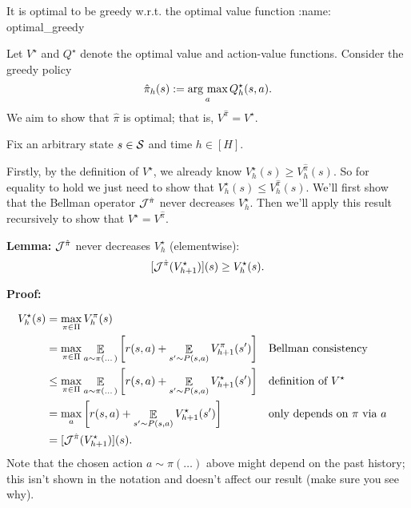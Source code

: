 \documentclass[\main/main]{subfiles}
\begin{document}
\begin{theorem}{It is optimal to be greedy w.r.t. the optimal value function}
:name: optimal_greedy

    Let $V^{\star}$ and $Q^{\star}$ denote the optimal value and action-value functions. Consider the greedy policy
    \[
        \hat \pi_h(s) := \argmax_a Q_h^{\star}(s, a).
    \]
    We aim to show that $\hat \pi$ is optimal; that is, $V^{\hat \pi} = V^{\star}$.

    Fix an arbitrary state $s \in \S$ and time $h \in [H]$.

    Firstly, by the definition of $V^{\star}$, we already know $V_h^{\star}(s) \ge V_h^{\hat \pi}(s)$. So for equality to hold we just need to show that $V_h^{\star}(s) \le V_h^{\hat \pi}(s)$. We'll first show that the Bellman operator $\bop^{\hat \pi}$ never decreases $V_h^{\star}$. Then we'll apply this result recursively to show that $V^{\star} = V^{\hat \pi}$.
    
    \textbf{Lemma:} $\bop^{\hat \pi}$ never decreases $V_h^{\star}$ (elementwise):
    \[
        [\bop^{\hat \pi} (V_{h+1}^{\star})](s) \ge V_h^{\star}(s).
    \]
    
    \textbf{Proof:}
    
    \begin{align*}
    V_h^{\star}(s) &= \max_{\pi \in \Pi} V_h^{\pi}(s) \\
    &= \max_{\pi \in \Pi} \mathop{\mathbb{E}}_{a \sim \pi(\dots)}\left[r(s, a) + \mathop{\mathbb{E}}_{s' \sim P(s, a)} V_{h+1}^\pi(s') \right] && \text{Bellman consistency} \\
    &\le \max_{\pi \in \Pi} \mathop{\mathbb{E}}_{a \sim \pi(\dots)}\left[r(s, a) + \mathop{\mathbb{E}}_{s' \sim P(s, a)} V_{h+1}^{\star}(s') \right] && \text{definition of } V^\star \\
    &= \max_{a} \left[ r(s, a) + \mathop{\mathbb{E}}_{s' \sim P(s, a)} V_{h+1}^{\star}(s') \right] && \text{only depends on } \pi \text{ via } a \\
    &= [\bop^{\hat \pi}(V_{h+1}^{\star})](s).
    \end{align*}
    Note that the chosen action $a \sim \pi(\dots)$ above might depend on the past history; this isn't shown in the notation and doesn't affect our result (make sure you see why).
    

\end{theorem}
\end{document}
